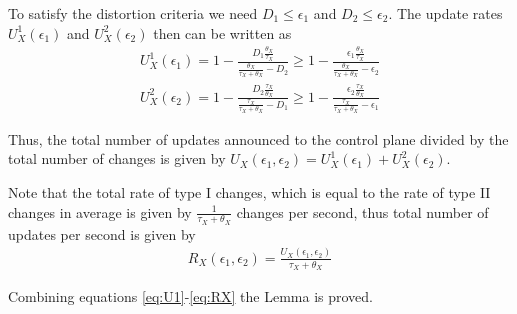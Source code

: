 \documentclass[conference]{IEEEtran}
\theoremstyle{plain}
\theoremstyle{remark}
\begin{document}
To satisfy the distortion criteria we need $D_1\leq \epsilon_1$ and $D_2 \leq \epsilon_2$. The update rates $U^1_X(\epsilon_1)$ and $U^2_X(\epsilon_2)$ then can be written as
\begin{eqnarray}
&U^{1}_X(\epsilon_1) = 1-\frac{D_1 \frac{\theta_X}{\tau_X}}{\frac{\theta_X}{\tau_X+\theta_X}-D_2} \geq 1-\frac{\epsilon_1 \frac{\theta_X}{\tau_X}}{\frac{\theta_X}{\tau_X+\theta_X}-\epsilon_2}& \label{eq:U1} \\
&U^{2}_X(\epsilon_2) = 1-\frac{D_2\frac{\tau_X}{\theta_X}}{\frac{\tau_X}{\tau_X+\theta_X}-D_1} \geq 1-\frac{\epsilon_2\frac{\tau_X}{\theta_X}}{\frac{\tau_X}{\tau_X+\theta_X}-\epsilon_1}& \label{eq:U2}
\end{eqnarray}

Thus, the total number of updates announced to the control plane divided by the total number of changes is given by $U_X(\epsilon_1,\epsilon_2) = U^{1}_X(\epsilon_1) + U^{2}_X(\epsilon_2)$.

Note that the total rate of type I changes, which is equal to the rate of type II changes in average is given by $\frac{1}{\tau_X+\theta_X}$ changes per second, thus total number of updates per second is given by
\begin{eqnarray}
R_X(\epsilon_1,\epsilon_2) = \frac{U_X(\epsilon_1,\epsilon_2)}{\tau_X+\theta_X} \label{eq:RX}
\end{eqnarray}

Combining equations \ref{eq:U1}-\ref{eq:RX} the Lemma is proved.
\end{document}
